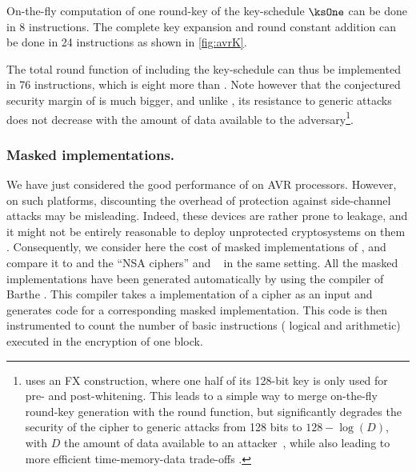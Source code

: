 On-the-fly computation of one round-key of the key-schedule $\ksOne$ can be done in 8 instructions. The complete key expansion and round constant addition can be done in 24 instructions
as shown in \autoref{fig:avrK}.

The total round function of \fly including the key-schedule can thus be implemented in 76 instructions, which is eight more than \pride. Note however that the conjectured security
margin of \fly is much bigger, and unlike \pride, its resistance to generic attacks does not decrease with the amount of data available to the adversary\footnote{\pride uses an FX construction,
where one half of its 128-bit key is only used for pre- and post-whitening. This
leads to a simple way to merge on-the-fly round-key generation with the round function, but significantly degrades the security of the cipher to generic attacks
from 128 bits to $128 - \log(D)$, with $D$ the amount of data available to an attacker~\cite{desx}, while also leading to more efficient time-memory-data trade-offs \cite{itaitmd}.}.

\subsubsection{Masked implementations.}
We have just considered the good performance of \fly on AVR processors. 
However, on such platforms, discounting the overhead of protection 
against side-channel attacks may be misleading. 
Indeed, these devices are rather prone to leakage, and it might not be 
entirely reasonable to deploy unprotected cryptosystems on them \cite{avrleak}.
Consequently, we consider here the cost of masked implementations of \fly, 
and compare it to \pride and the ``NSA ciphers'' \simon and \speck~\cite{NSAciph} in the same setting.
All the masked implementations have been generated automatically by 
using the compiler of Barthe \etal{} \cite{maskingcomp}.
This compiler takes a \C implementation of a cipher as an input and generates \C code for a corresponding masked implementation. This code is then instrumented to count the number of basic instructions
(\eg{} logical and arithmetic) executed in the encryption of one block.
 
